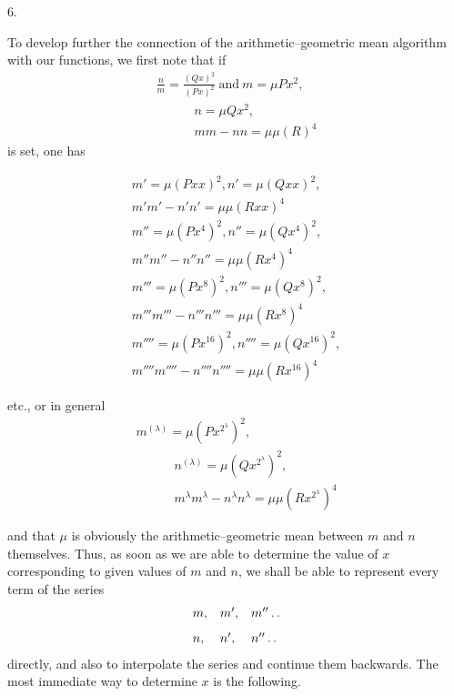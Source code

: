 \begingroup
\renewcommand{\arraystretch}{1.45}

\par\medskip{}\centerline{6.}\nobreak\smallskip
To develop further the connection of the arithmetic–geometric mean algorithm with our functions, we first note that if
\[
\begin{gathered}\frac{n}{m}=\frac{(Qx)^2}{(Px)^2}\ \text{and}\ m=\mu Px^2,\\[8pt]\quad{}\qquad n=\mu Qx^2,\\[8pt]\quad{}\qquad mm-nn=\mu\mu(R)^4\end{gathered}
\]
is set, one has



\[
\begin{gathered}
m'=\mu(Pxx)^2, n'=\mu(Qxx)^2,\\[6pt]m'm'-n'n'=\mu\mu(Rxx)^4\\[8pt]
m''=\mu(Px^4)^2,n''=\mu(Qx^4)^2,\\[6pt]m''m''-n''n''=\mu\mu(Rx^4)^4\\[8pt]
m'''=\mu(Px^8)^2,n'''=\mu(Qx^8)^2,\\[6pt]m'''m'''-n'''n'''=\mu\mu(Rx^8)^4\\[8pt]
m''''=\mu(Px^{16})^2,n''''=\mu(Qx^{16})^2,\\[6pt]m''''m''''-n''''n''''=\mu\mu(Rx^{16})^4
\end{gathered}
\]

etc., or in general
\[
\begin{gathered}m^{(\lambda)}=\mu(Px^{2^\lambda})^2,\\[8pt]\quad{}\qquad
n^{(\lambda)}=\mu(Qx^{2^\lambda})^2,\\[8pt]\quad{}\qquad
m^\lambda m^\lambda-n^\lambda n^\lambda=\mu\mu(Rx^{2^\lambda})^4\end{gathered}
\]

and that $\mu$ is obviously the arithmetic–geometric mean between $m$ and $n$ themselves. Thus, as soon as we are able to determine the value of $x$ corresponding to given values of $m$ and $n$, we shall be able to represent every term of the series
\[
\begin{array}{lll}
m,&m',&m''\mathinner{.\,.}\\[8pt]
n,&n',&n''\mathinner{.\,.}
\end{array}
\]
directly, and also to interpolate the series and continue them backwards. The most immediate way to determine $x$ is the following.


